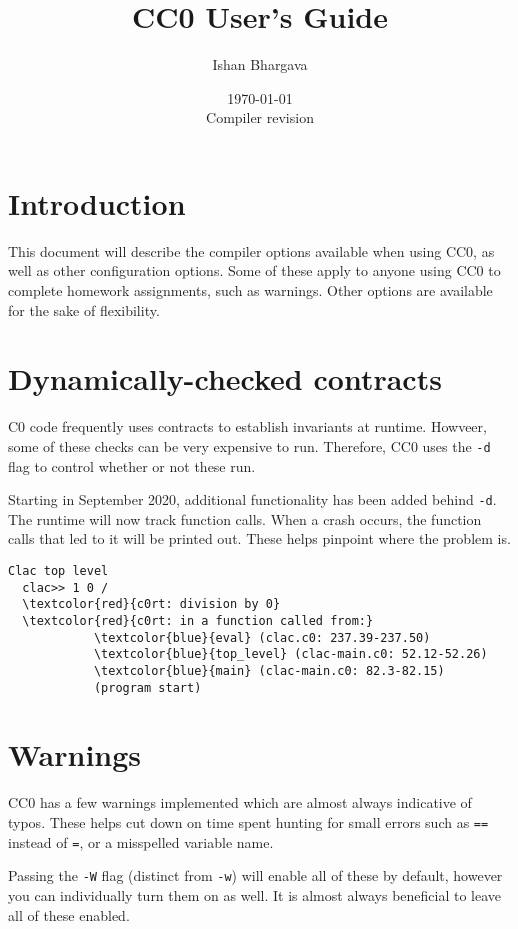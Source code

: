 \documentclass[11pt]{article}
\title{CC0 User's Guide}
\author{Ishan Bhargava}
\date{\today\\Compiler revision \rev}
\begin{document}
\maketitle

\section{Introduction}

This document will describe the compiler options available when using CC0, as well as other configuration options. Some of these apply to anyone using CC0 to complete homework assignments, such as warnings. Other options are available for the sake of flexibility. 

\section{Dynamically-checked contracts}

C0 code frequently uses contracts to establish invariants at runtime. Howveer, some of these checks can be very expensive to run. Therefore, CC0 uses the \texttt{-d} flag to control whether or not these run.

Starting in September 2020, additional functionality has been added behind \texttt{-d}. The runtime will now track function calls. When a crash occurs, the function calls that led to it will be printed out. These helps pinpoint where the problem is.

\begin{Verbatim}[commandchars=\\\{\}]
  Clac top level
  clac>> 1 0 /
  \textcolor{red}{c0rt: division by 0}
  \textcolor{red}{c0rt: in a function called from:}
            \textcolor{blue}{eval} (clac.c0: 237.39-237.50)
            \textcolor{blue}{top_level} (clac-main.c0: 52.12-52.26)
            \textcolor{blue}{main} (clac-main.c0: 82.3-82.15)
            (program start)    
\end{Verbatim}

\section{Warnings}

CC0 has a few warnings implemented which are almost always indicative of typos. These helps cut down on time spent hunting for small errors such as \texttt{==} instead of \texttt{=}, or a misspelled variable name. 

Passing the \texttt{-W} flag (distinct from \texttt{-w}) will enable all of these by default, however you can individually turn them on as well.
It is almost always beneficial to leave all of these enabled.
\end{document}
